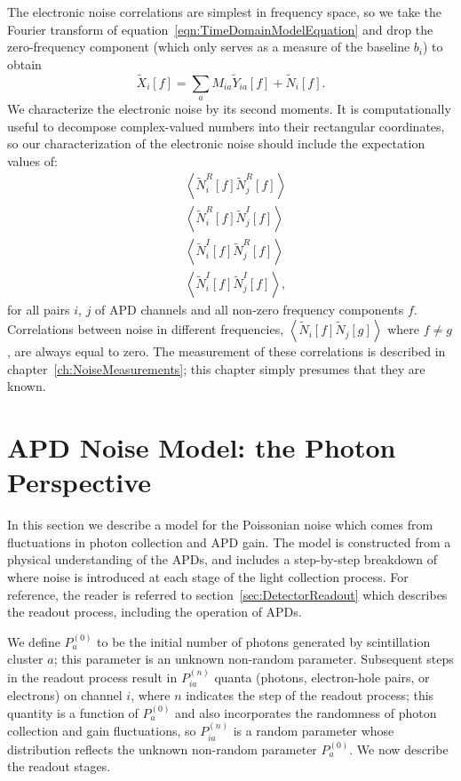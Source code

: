 The electronic noise correlations are simplest in frequency space, so we take the Fourier transform of equation~\ref{eqn:TimeDomainModelEquation} and drop the zero-frequency component (which only serves as a measure of the baseline $b_i$) to obtain
\begin{equation}\label{FrequencyDomainModelEquation}
\widetilde{X}_i[f] = \sum_a M_{ia}\widetilde{Y}_{ia}[f] + \widetilde{N}_i[f].
\end{equation}
We characterize the electronic noise by its second moments.  It is computationally useful to decompose complex-valued numbers into their rectangular coordinates, so our characterization of the electronic noise should include the expectation values of:
\begin{subequations}\label{eq:FirstStatementOfNoiseCorrelations}\begin{align}
&\left< \widetilde{N}^R_i[f]\widetilde{N}^R_j[f] \right> \\
&\left< \widetilde{N}^R_i[f]\widetilde{N}^I_j[f] \right> \\
&\left< \widetilde{N}^I_i[f]\widetilde{N}^R_j[f] \right> \\
&\left< \widetilde{N}^I_i[f]\widetilde{N}^I_j[f] \right>,
\end{align}\end{subequations}
for all pairs $i$, $j$ of APD channels and all non-zero frequency components $f$.  Correlations between noise in different frequencies, $\left<\widetilde{N}_i[f]\widetilde{N}_j[g]\right>$ where $f \ne g$, are always equal to zero.  The measurement of these correlations is described in chapter~\ref{ch:NoiseMeasurements}; this chapter simply presumes that they are known.

\section{APD Noise Model: the Photon Perspective}\label{sec:DescriptionOfPhotonNoise}

In this section we describe a model for the Poissonian noise which comes from fluctuations in photon collection and APD gain.  The model is constructed from a physical understanding of the APDs, and includes a step-by-step breakdown of where noise is introduced at each stage of the light collection process.  For reference, the reader is referred to section~\ref{sec:DetectorReadout} which describes the readout process, including the operation of APDs.

We define $P_a^{(0)}$ to be the initial number of photons generated by scintillation cluster $a$; this parameter is an unknown non-random parameter.  Subsequent steps in the readout process result in $P_{ia}^{(n)}$ quanta (photons, electron-hole pairs, or electrons) on channel $i$, where $n$ indicates the step of the readout process; this quantity is a function of $P_a^{(0)}$ and also incorporates the randomness of photon collection and gain fluctuations, so $P_{ia}^{(n)}$ is a random parameter whose distribution reflects the unknown non-random parameter $P_a^{(0)}$.  We now describe the readout stages.

